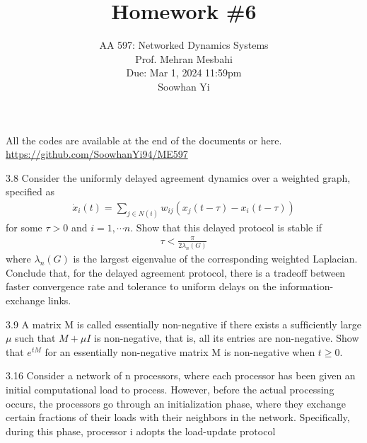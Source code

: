\documentclass{article}
\begin{document}
\setcounter{problem}{0}
\title{Homework \#6}
\author{
    \normalsize{AA 597: Networked Dynamics Systems}\\
    \normalsize{Prof. Mehran Mesbahi}\\
    \normalsize{Due: Mar 1, 2024 11:59pm}\\
    \normalsize{Soowhan Yi}
}
\date{{}}
\maketitle

All the codes are available at the end of the documents or here.
\url{https://github.com/SoowhanYi94/ME597}
\begin{problem}3.8
    Consider the uniformly delayed agreement dynamics over a weighted graph, speciﬁed as
    \begin{align*}
        \dot x_i(t) = \sum_{j \in N(i)} w_{ij} (x_j(t - \tau) - x_i (t-\tau))
    \end{align*}
    for some $\tau > 0$ and $i = 1, \cdots n$. Show that this delayed protocol is stable if 
    \begin{align*}
        \tau < \frac{\pi}{2\lambda_n(G)}
    \end{align*}
    where $\lambda_n(G)$ is the largest eigenvalue of the corresponding weighted Laplacian. Conclude that, for the delayed agreement protocol, there is a tradeoff between faster convergence rate and tolerance to uniform delays on the information-exchange links.
\end{problem}
\begin{problem} 3.9
    A matrix M is called essentially non-negative if there exists a sufﬁciently large $\mu$ such that $M + \mu I$ is non-negative, that is, all its entries are non-negative. Show that $e^{tM}$ for an essentially non-negative matrix M is non-negative when $t \geq 0.$

\end{problem}
\begin{problem} 3.16
    Consider a network of n processors, where each processor has been given an initial computational load to process. However, before the actual processing occurs, the processors go through an initialization phase, where they exchange certain fractions of their loads with their neighbors in the network. Speciﬁcally, during this phase, processor i adopts the load-update protocol
\end{problem}
\end{document}
